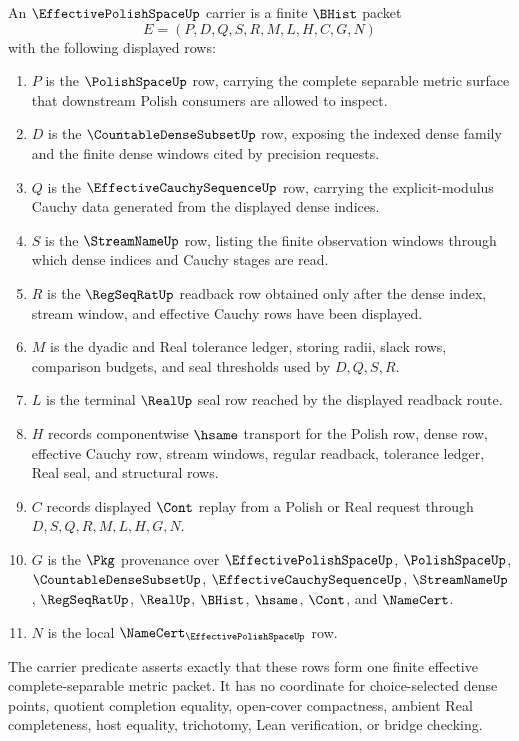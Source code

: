 \begin{definition}\label{def:effective-polish-space-carrier}
An $\EffectivePolishSpaceUp$ carrier is a finite $\BHist$ packet
$$
E=(P,D,Q,S,R,M,L,H,C,G,N)
$$
with the following displayed rows:
\begin{enumerate}
\item $P$ is the $\PolishSpaceUp$ row, carrying the complete separable metric surface that downstream Polish consumers are allowed to inspect.
\item $D$ is the $\CountableDenseSubsetUp$ row, exposing the indexed dense family and the finite dense windows cited by precision requests.
\item $Q$ is the $\EffectiveCauchySequenceUp$ row, carrying the explicit-modulus Cauchy data generated from the displayed dense indices.
\item $S$ is the $\StreamNameUp$ row, listing the finite observation windows through which dense indices and Cauchy stages are read.
\item $R$ is the $\RegSeqRatUp$ readback row obtained only after the dense index, stream window, and effective Cauchy rows have been displayed.
\item $M$ is the dyadic and Real tolerance ledger, storing radii, slack rows, comparison budgets, and seal thresholds used by $D,Q,S,R$.
\item $L$ is the terminal $\RealUp$ seal row reached by the displayed readback route.
\item $H$ records componentwise $\hsame$ transport for the Polish row, dense row, effective Cauchy row, stream windows, regular readback, tolerance ledger, Real seal, and structural rows.
\item $C$ records displayed $\Cont$ replay from a Polish or Real request through $D,S,Q,R,M,L,H,G,N$.
\item $G$ is the $\Pkg$ provenance over $\EffectivePolishSpaceUp$, $\PolishSpaceUp$, $\CountableDenseSubsetUp$, $\EffectiveCauchySequenceUp$, $\StreamNameUp$, $\RegSeqRatUp$, $\RealUp$, $\BHist$, $\hsame$, $\Cont$, and $\NameCert$.
\item $N$ is the local $\NameCert_{\EffectivePolishSpaceUp}$ row.
\end{enumerate}
The carrier predicate asserts exactly that these rows form one finite effective complete-separable metric packet. It has no coordinate for choice-selected dense points, quotient completion equality, open-cover compactness, ambient Real completeness, host equality, trichotomy, Lean verification, or bridge checking.
\end{definition}

